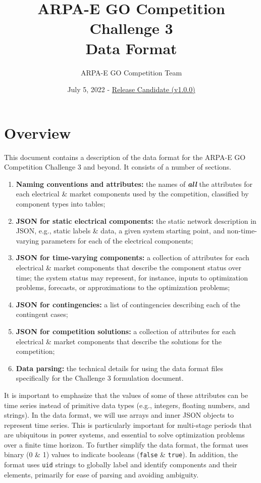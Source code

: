 \documentclass{article}
\title{ARPA-E GO Competition Challenge 3 \\ Data Format}
\author{ARPA-E GO Competition Team}
\date{July 5, 2022 - \underline{Release Candidate (v1.0.0)}}
\begin{document}
\maketitle





\section{Overview}

This document contains a description of the data format for the ARPA-E GO Competition Challenge 3 and beyond. It consists of a number of sections.
\begin{enumerate}[I]
    \item {\bf Naming conventions and attributes:} the names of \textit{\textbf{all}} the attributes for each electrical \& market components used by the competition, classified by component types into tables;

    \item {\bf JSON for static electrical components:} the static network description in JSON, e.g., static labels \& data, a given system starting point, and non-time-varying parameters for each of the electrical components;

    \item {\bf JSON for time-varying components:} a collection of attributes for each electrical \& market components that describe the component status over time; the system status may represent, for instance, inputs to optimization problems,  forecasts, or approximations to the optimization problems;
    \item {\bf JSON for contingencies:} a list of contingencies describing each of the contingent cases;
    \item {\bf JSON for competition solutions:} a collection of attributes for each electrical \& market components that describe the solutions for the competition;
     \item {\bf Data parsing:}
     the technical details for using the data format files specifically for the Challenge 3 formulation document.
\end{enumerate}
It is important to emphasize that the values of some of these attributes can be time series instead of primitive data types (e.g., integers, floating numbers, and strings).
In the data format, we will use arrays and inner JSON objects to represent time series.
This is particularly important for multi-stage periods that are ubiquitous in power systems, and essential
to solve optimization problems over a finite time horizon.
To further simplify the data format, the format uses binary (0 \& 1) values to indicate booleans (\texttt{false} \& \texttt{true}).
In addition, the format uses \texttt{uid} strings to globally label and identify components and their elements, primarily for ease of parsing and avoiding ambiguity. 
\end{document}
